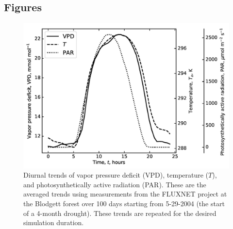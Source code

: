 \documentclass[utf8]{frontiersSCNS} %
\begin{document}







\clearpage

\subsection{Figures}

\begin{figure}[h]
    \begin{center}
         \includegraphics[scale=0.75]{environment.jpg} 
    \end{center}
    \caption{Diurnal trends of vapor pressure deficit (VPD), temperature ($T$), and photosynthetically active radiation (PAR). These are the averaged trends using measurements from the FLUXNET project at the Blodgett forest over 100 days starting from 5-29-2004 (the start of a 4-month drought). These trends are repeated for the desired simulation duration.}
    \label{fig:environment}
\end{figure}
\end{document}
